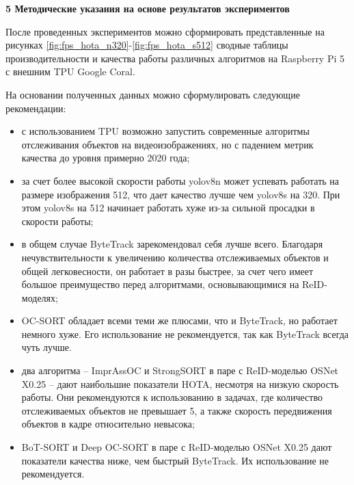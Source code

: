 \newpage
\begin{center}
  \textbf{\large 5 Методические указания на основе результатов экспериментов}
\end{center}
После проведенных экспериментов можно сформировать представленные на рисунках \ref{fig:fps_hota_n320}-\ref{fig:fps_hota_s512} сводные таблицы производительности и качества работы различных алгоритмов на Raspberry Pi 5 с внешним TPU Google Coral.

На основании полученных данных можно сформулировать следующие рекомендации:
\begin{itemize}
  \item с использованием TPU возможно запустить современные алгоритмы отслеживания объектов на видеоизображениях, но с падением метрик качества до уровня примерно 2020 года;
  \item за счет более высокой скорости работы yolov8n может успевать работать на размере изображения 512, что дает качество лучше чем yolov8s на 320. При этом yolov8s на 512 начинает работать хуже из-за сильной просадки в скорости работы;
  \item в общем случае ByteTrack зарекомендовал себя лучше всего. Благодаря нечувствительности к увеличению количества отслеживаемых объектов и общей легковесности, он работает в разы быстрее, за счет чего имеет большое преимущество перед алгоритмами, основывающимися на ReID-моделях; 
  \item OC-SORT обладает всеми теми же плюсами, что и ByteTrack, но работает немного хуже. Его использование не рекомендуется, так как ByteTrack всегда чуть лучше.
  \item два алгоритма -- ImprAssOC и StrongSORT в паре с ReID-моделью OSNet X0.25 -- дают наибольшие показатели HOTA, несмотря на низкую скорость работы. Они рекомендуются к использованию в задачах, где количество отслеживаемых объектов не превышает 5, а также скорость передвижения объектов в кадре относительно невысока;
  \item BoT-SORT и Deep OC-SORT в паре с ReID-моделью OSNet X0.25 дают показатели качества ниже, чем быстрый ByteTrack. Их использование не рекомендуется.
\end{itemize}




